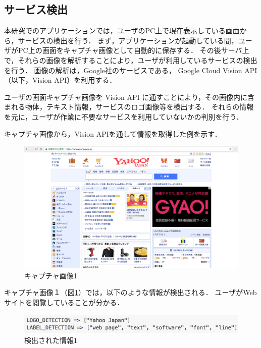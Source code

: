 \subsection{サービス検出}
本研究でのアプリケーションでは，ユーザのPC上で現在表示している画面から，サービスの検出を行う．
まず，アプリケーションが起動している間，ユーザがPC上の画面をキャプチャ画像として自動的に保存する．
その後サーバ上で，それらの画像を解析することにより，ユーザが利用しているサービスの検出を行う．
画像の解析は，Google社のサービスである， Google Cloud Vision API （以下，Vision API）を利用する．

ユーザの画面キャプチャ画像を Vision API に通すことにより，その画像内に含まれる物体，テキスト情報，サービスのロゴ画像等を検出する．
それらの情報を元に，ユーザが作業に不要なサービスを利用していないかの判別を行う．

\clearpage

キャプチャ画像から，Vision APIを通して情報を取得した例を示す．

\begin{figure}[h]
  \begin{center}
  \includegraphics[width=14.0cm]{graphics/screenshot01.png}
  \caption{キャプチャ画像1}
  \label{fig:screenshot01}
  \end{center}
\end{figure}

キャプチャ画像１（図\ref{fig:screenshot01}）では，以下のような情報が検出される．
ユーザがWebサイトを閲覧していることが分かる．

\begin{figure}[h]
  \begin{center}
  \includegraphics[width=14.0cm]{graphics/response01.png}
  \caption{検出された情報1}
  \label{fig:response01}
  \end{center}
\end{figure}

